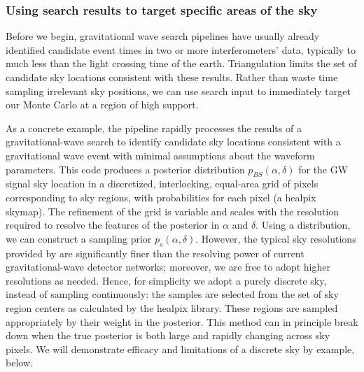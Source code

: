 \subsubsection{Using search results to target specific areas of the sky}

%
Before we begin, gravitational wave search pipelines have usually already identified candidate event times in two or
more interferometers' data, typically to much less than the light crossing time of the earth.  Triangulation limits the
set of candidate sky locations consistent with these results.  Rather than waste time sampling irrelevant sky positions,
we can use search input to immediately target our Monte Carlo at a region of high support.


As a concrete example, the \BS{} pipeline \cite{gw-astro-Bayestar} rapidly processes the results of a gravitational-wave search to identify candidate sky locations consistent with a gravitational wave event with minimal assumptions about the waveform parameters.
%
This code produces a posterior distribution $p_{BS}(\alpha,\delta)$ for the GW signal sky location in a discretized, interlocking, equal-area
grid of pixels corresponding to sky regions, with probabilities for each pixel (a healpix skymap). The refinement of the
grid is variable and scales with the resolution required to resolve the features of the posterior in $\alpha$ and
$\delta$.  
%
%
Using a  distribution, we can construct a sampling prior  $p_s(\alpha,\delta)$.
%
However,  the typical sky resolutions provided by \BS{} are significantly finer than the resolving power of current
gravitational-wave detector networks;   moreover, we are free to adopt higher resolutions as needed.  Hence,  for
simplicity we adopt a purely discrete sky, instead of sampling continuously: the samples are selected from the set of sky
region centers as calculated by the healpix library. These regions are sampled appropriately by their weight in the
posterior.   This method can in principle break down when the true posterior is both large and rapidly changing across
sky pixels.  We will demonstrate efficacy and limitations of a discrete sky by example, below.


